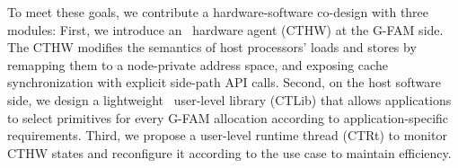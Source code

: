 To meet these goals, we contribute a hardware-software co-design with three modules:
First, we introduce an \name~hardware agent (CTHW) at the G-FAM side. The CTHW modifies the semantics of host processors' loads and stores by remapping them to a node-private address space, and exposing cache synchronization with explicit side-path API calls.
Second, on the host software side, we design a lightweight \name~user-level library (CTLib) that allows applications to select primitives for every G-FAM allocation according to application-specific requirements.
Third, we propose a user-level runtime thread (CTRt) to monitor CTHW states and reconfigure it according to the use case to maintain efficiency.




